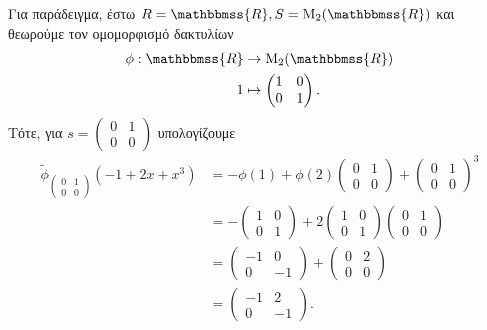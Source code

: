 \documentclass[12pt,a4paper,reqno]{amsart}
\theoremstyle{definition}
\theoremstyle{remark}
\numberwithin{theorem}{section}
\numberwithin{exercise}{section}
\numberwithin{equation}{section}
\newcommand{\RR}{\mathbbmss{R}}
\newcommand{\rmM}{\mathrm{M}}
\renewcommand{\to}{\rightarrow}
\begin{document}
Για παράδειγμα, έστω $R = \RR, S = \rmM_2(\RR)$ και θεωρούμε τον ομομορφισμό δακτυλίων 
\begin{align*}
        \phi : \RR &\to \rmM_2(\RR) \\
                1  &\mapsto \begin{pmatrix}
                    1 & 0 \\ 0 & 1
                \end{pmatrix}.
\end{align*}
Τότε, για $s = \left(\begin{smallmatrix}
0 & 1 \\ 0 & 0
\end{smallmatrix}\right)$ υπολογίζουμε 
\begin{align*}
\tilde{\phi}_{\left(\begin{smallmatrix}
0 & 1 \\ 0 & 0
\end{smallmatrix}\right)}(-1 + 2x + x^3) &= 
- \phi(1) + \phi(2)\begin{pmatrix}
    0 & 1 \\ 0 & 0
\end{pmatrix} + \begin{pmatrix}
    0 & 1 \\ 0 & 0
\end{pmatrix}^3 \\
&= 
-\begin{pmatrix}
    1 & 0 \\ 0 & 1
\end{pmatrix}
+ 2\begin{pmatrix}
    1 & 0 \\ 0 & 1
\end{pmatrix}\begin{pmatrix}
    0 & 1 \\ 0 & 0
\end{pmatrix} \\ 
&= 
\begin{pmatrix}
    -1 & 0 \\ 0 & -1
\end{pmatrix}
+ \begin{pmatrix}
    0 & 2 \\ 0 & 0
\end{pmatrix} \\ 
&= \begin{pmatrix}
    -1 & 2 \\
    0  & -1
\end{pmatrix}.
\end{align*}
\end{document}
